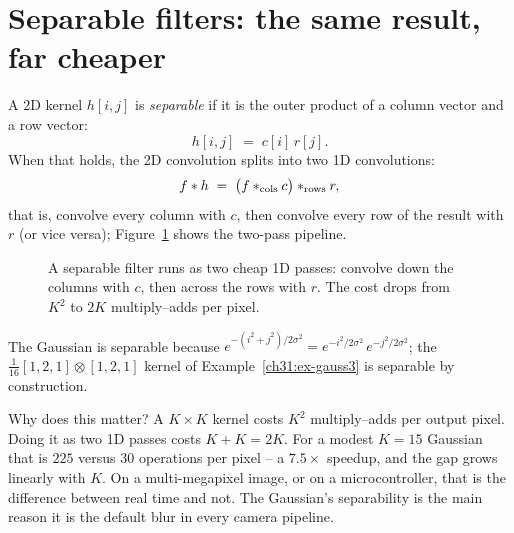 \section{Separable filters: the same result, far cheaper}
\label{ch31:separable}

A 2D kernel $h[i,j]$ is \emph{separable} if it is the outer product of a column
vector and a row vector:
\begin{equation}
h[i,j] \;=\; c[i]\, r[j].
\label{ch31:sep}
\end{equation}
When that holds, the 2D convolution splits into two 1D convolutions:
\begin{equation}
f \ast h \;=\; \big(f \ast_{\text{cols}} c\big) \ast_{\text{rows}} r,
\label{ch31:sepconv}
\end{equation}
that is, convolve every column with $c$, then convolve every row of the result with
$r$ (or vice versa); Figure~\ref{ch31:fig-sep} shows the two-pass pipeline.

\begin{figure}[H]
\centering
{}
\caption{A separable filter runs as two cheap 1D passes: convolve down the columns
with $c$, then across the rows with $r$. The cost drops from $K^2$ to $2K$
multiply--adds per pixel.}
\label{ch31:fig-sep}
\end{figure} The Gaussian is separable because
$e^{-(i^2+j^2)/2\sigma^2} = e^{-i^2/2\sigma^2}\,e^{-j^2/2\sigma^2}$; the
$\frac1{16}[1,2,1]\otimes[1,2,1]$ kernel of Example~\ref{ch31:ex-gauss3} is
separable by construction.

\begin{whybox}
Why does this matter? A $K\times K$ kernel costs $K^2$ multiply--adds per
output pixel. Doing it as two 1D passes costs $K + K = 2K$. For a modest $K=15$
Gaussian that is $225$ versus $30$ operations per pixel -- a $7.5\times$ speedup, and
the gap grows linearly with $K$. On a multi-megapixel image, or on a
microcontroller, that is the difference between real time and not. The Gaussian's
separability is the main reason it is the default blur in every camera pipeline.
\end{whybox}

